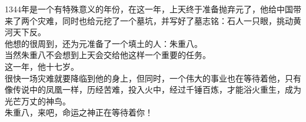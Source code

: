 \begin{multicols}{\theparacolNo}
1344年是一个有特殊意义的年份，在这一年，上天终于准备抛弃元了，他给中国带来了两个灾难，同时也给元挖了一个墓坑，并写好了墓志铭：石人一只眼，挑动黄河天下反。\\

他想的很周到，还为元准备了一个填土的人：朱重八。\\

当然朱重八不会想到上天会交给他这样一个重要的任务。\\

这一年，他十七岁。\\

很快一场灾难就要降临到他的身上，但同时，一个伟大的事业也在等待着他，只有像传说中的凤凰一样，历经苦难，投入火中，经过千锤百炼，才能浴火重生，成为光芒万丈的神鸟。\\

朱重八，来吧，命运之神正在等待着你！\\
\ifnum{}
	\end{multicols}
\fi
\newpage

